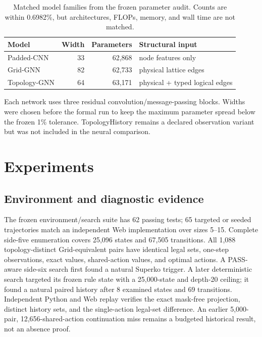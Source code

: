\documentclass{article}
\begin{document}
\begin{table}[H]
  \centering
  \caption{Matched model families from the frozen parameter audit. Counts are
  within 0.6982\%, but architectures, FLOPs, memory, and wall time are not
  matched.}
  \label{tab:model-parameters}
  \begin{tabular}{lrrl}
    \toprule
    Model & Width & Parameters & Structural input \\
    \midrule
    Padded-CNN & 33 & 62,868 & node features only \\
    Grid-GNN & 82 & 62,733 & physical lattice edges \\
    Topology-GNN & 64 & 63,171 & physical + typed logical edges \\
    \bottomrule
  \end{tabular}
\end{table}

Each network uses three residual convolution/message-passing blocks. Widths
were chosen before the formal run to keep the maximum parameter spread below
the frozen 1\% tolerance. TopologyHistory remains a declared observation
variant but was not included in the neural comparison.

\section{Experiments}
\label{sec:experiments}

\subsection{Environment and diagnostic evidence}

The frozen environment/search suite has 62 passing tests; 65 targeted or seeded
trajectories match an independent Web implementation over sizes 5--15.
Complete side-five enumeration covers 25,096 states and 67,505 transitions.
All 1,088 topology-distinct Grid-equivalent pairs have identical legal sets,
one-step observations, exact values, shared-action values, and optimal actions.
A PASS-aware side-six search first found a natural Superko trigger. A later
deterministic search targeted its frozen rule state with a 25,000-state and
depth-20 ceiling; it found a natural paired history after 8 examined states
and 69 transitions. Independent Python and Web replay verifies the exact
mask-free projection, distinct history sets, and the single-action legal-set
difference. An earlier 5,000-pair, 12,656-shared-action continuation miss
remains a budgeted historical result, not an absence proof.
\end{document}
